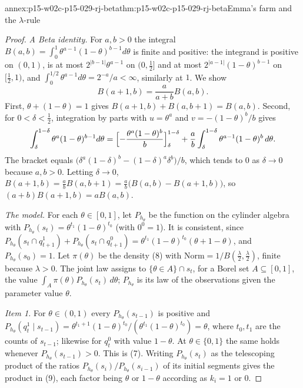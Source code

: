 \begin{annexitem}{annex:p15-w02c-p15-029-rj-beta}{thm:p15-w02c-p15-029-rj-beta}{Emma's farm and the \texorpdfstring{\(\lambda\)}{lambda}-rule}
\begin{proof}
\emph{A Beta identity.} For \(a,b>0\) the integral
\(B(a,b)=\int_0^1\theta^{a-1}(1-\theta)^{b-1}d\theta\) is finite and
positive: the integrand is positive on \((0,1)\), is at most
\(2^{|b-1|}\theta^{a-1}\) on \((0,\tfrac12]\) and at most
\(2^{|a-1|}(1-\theta)^{b-1}\) on \([\tfrac12,1)\), and
\(\int_0^{1/2}\theta^{a-1}d\theta=2^{-a}/a<\infty\), similarly at \(1\).
We show
\[
 B(a+1,b)=\frac{a}{a+b}B(a,b).
\]
First, \(\theta+(1-\theta)=1\) gives \(B(a+1,b)+B(a,b+1)=B(a,b)\).
Second, for \(0<\delta<\tfrac12\), integration by parts with
\(u=\theta^a\) and \(v=-(1-\theta)^b/b\) gives
\[
 \int_\delta^{1-\delta}\theta^a(1-\theta)^{b-1}d\theta
 =\Bigl[-\frac{\theta^a(1-\theta)^b}{b}\Bigr]_\delta^{1-\delta}
 +\frac ab\int_\delta^{1-\delta}\theta^{a-1}(1-\theta)^b\,d\theta .
\]
The bracket equals \(\bigl(\delta^a(1-\delta)^b-(1-\delta)^a\delta^b\bigr)/b\),
which tends to \(0\) as \(\delta\to0\) because \(a,b>0\). Letting
\(\delta\to0\), \(B(a+1,b)=\frac ab B(a,b+1)=\frac ab\bigl(B(a,b)-B(a+1,b)\bigr)\),
so \((a+b)B(a+1,b)=aB(a,b)\).

\emph{The model.} For each \(\theta\in[0,1]\), let \(P_{h_\theta}\) be
the function on the cylinder algebra with
\(P_{h_\theta}(s_t)=\theta^{t_1}(1-\theta)^{t_0}\) (with \(0^0=1\)). It
is consistent, since
\(P_{h_\theta}(s_t\cap q^1_{t+1})+P_{h_\theta}(s_t\cap q^0_{t+1})=\theta^{t_1}(1-\theta)^{t_0}(\theta+1-\theta)\),
and \(P_{h_\theta}(s_0)=1\). Let \(\pi(\theta)\) be the density (8) with
\(\mathrm{Norm}=1/B(\tfrac\lambda2,\tfrac\lambda2)\), finite because
\(\lambda>0\). The joint law assigns to \(\{\theta\in A\}\cap s_t\), for
a Borel set \(A\subseteq[0,1]\), the value
\(\int_A\pi(\theta)P_{h_\theta}(s_t)\,d\theta\); \(P_{h_\theta}\) is its
law of the observations given the parameter value \(\theta\).

\emph{Item 1.} For \(\theta\in(0,1)\) every \(P_{h_\theta}(s_{t-1})\) is
positive and
\(P_{h_\theta}(q^1_t\mid s_{t-1})=\theta^{t_1+1}(1-\theta)^{t_0}/(\theta^{t_1}(1-\theta)^{t_0})=\theta\),
where \(t_0,t_1\) are the counts of \(s_{t-1}\); likewise for \(q^0_t\)
with value \(1-\theta\). At \(\theta\in\{0,1\}\) the same holds whenever
\(P_{h_\theta}(s_{t-1})>0\). This is (7). Writing \(P_{h_\theta}(s_t)\)
as the telescoping product of the ratios
\(P_{h_\theta}(s_i)/P_{h_\theta}(s_{i-1})\) of its initial segments
gives the product in (9), each factor being \(\theta\) or \(1-\theta\)
according as \(k_i=1\) or \(0\).


\end{proof}
\end{annexitem}
